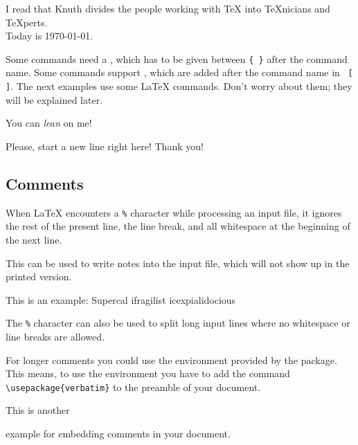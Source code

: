 \begin{example}
I read that Knuth divides the 
people working with \TeX{} into 
\TeX{}nicians and \TeX perts.\\
Today is \today.
\end{example}

Some commands need a , which has to be given between
 \verb|{ }| after the command name. Some commands support
, which are added after the command name in
~\verb|[ ]|. The next examples use some \LaTeX{}
commands. Don't worry about them; they will be explained later.

\begin{example}
You can \textsl{lean} on me!
\end{example}
\begin{example}
Please, start a new line
right here!\newline
Thank you!
\end{example}

\subsection{Comments}

When \LaTeX{} encounters a \verb|%| character while processing an input file,
it ignores the rest of the present line, the line break, and all
whitespace at the beginning of the next line.

This can be used to write notes into the input file, which will not show up
in the printed version.

\begin{example}
This is an %
example: Supercal%
              ifragilist%
    icexpialidocious
\end{example}

The \texttt{\%} character can also be used to split long input lines where no
whitespace or line breaks are allowed.

For longer comments you could use the  environment
provided by the  package. This means, to use the
 environment you have to add the command
\verb|\usepackage{verbatim}| to the preamble of your document.

\begin{example}
This is another
\begin{comment}
rather stupid,
but helpful
\end{comment}
example for embedding
comments in your document.
\end{example}

